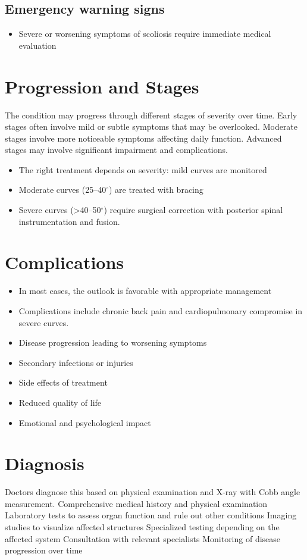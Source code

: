 \subsection{Emergency warning signs}
\begin{itemize}[noitemsep]
  \item Severe or worsening symptoms of scoliosis require immediate medical evaluation
\end{itemize}
\section{Progression and Stages}
The condition may progress through different stages of severity over time. Early stages often involve mild or subtle symptoms that may be overlooked. Moderate stages involve more noticeable symptoms affecting daily function. Advanced stages may involve significant impairment and complications.

\begin{itemize}[noitemsep]
  \item The right treatment depends on severity: mild curves are monitored
  \item Moderate curves (25--40$^\circ$) are treated with bracing
  \item Severe curves (>40--50$^\circ$) require surgical correction with posterior spinal instrumentation and fusion.
\end{itemize}
\section{Complications}
\begin{itemize}[noitemsep]
  \item In most cases, the outlook is favorable with appropriate management
  \item Complications include chronic back pain and cardiopulmonary compromise in severe curves.
  \item Disease progression leading to worsening symptoms
  \item Secondary infections or injuries
  \item Side effects of treatment
  \item Reduced quality of life
  \item Emotional and psychological impact
\end{itemize}
\section{Diagnosis}
Doctors diagnose this based on physical examination and X-ray with Cobb angle measurement. Comprehensive medical history and physical examination Laboratory tests to assess organ function and rule out other conditions Imaging studies to visualize affected structures Specialized testing depending on the affected system Consultation with relevant specialists Monitoring of disease progression over time

